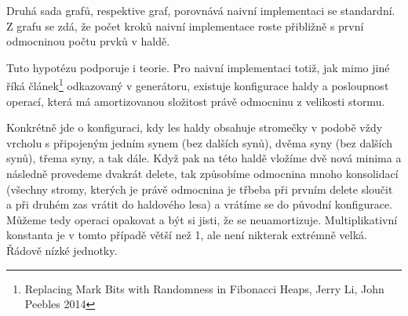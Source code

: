 \documentclass[12pt,a4paper]{report}
\begin{document}
Druhá sada grafů, respektive graf, porovnává naivní implementaci se standardní. Z grafu se zdá, že počet kroků naivní implementace roste přibližně s první odmocninou počtu prvků v haldě.

Tuto hypotézu podporuje i teorie. Pro naivní implementaci totiž, jak mimo jiné říká článek\footnote{Replacing Mark Bits with Randomness in Fibonacci Heaps, Jerry Li, John Peebles 2014} odkazovaný v generátoru, existuje konfigurace haldy a posloupnost operací, která má amortizovanou složitost právě odmocninu z velikosti stormu. 

Konkrétně jde o konfiguraci, kdy les haldy obsahuje stromečky v podobě vždy vrcholu s připojeným jedním synem (bez dalších synů), dvěma syny (bez dalších synů), třema syny, a tak dále. Když pak na této haldě vložíme dvě nová minima a následně provedeme dvakrát delete, tak způsobíme odmocnina mnoho konsolidací (všechny stromy, kterých je právě odmocnina je třbeba při prvním delete sloučit a při druhém zas vrátit do haldového lesa) a vrátíme se do původní konfigurace. Můžeme tedy operaci opakovat a být si jisti, že se neuamortizuje. Multiplikativní konstanta je v tomto případě větší než 1, ale není nikterak extrémně velká. Řádově nízké jednotky. 
\end{document}

